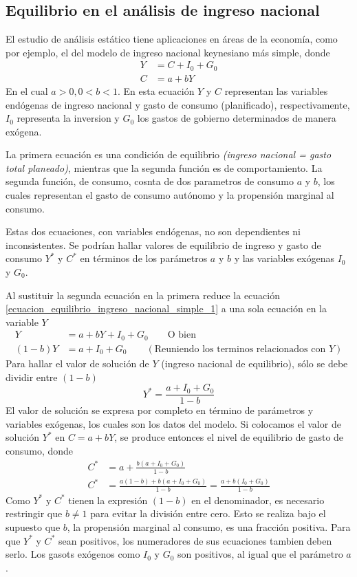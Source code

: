 \subsection{Equilibrio en el análisis de ingreso nacional}

El estudio de análisis estático tiene aplicaciones en áreas de la economía, como por ejemplo, el del modelo de ingreso nacional keynesiano más simple, donde
\begin{equation}
\label{ecuacion_equilibrio_ingreso_nacional_simple_1}
\begin{aligned}
Y &= C + I_0 + G_0 \\
C &= a + bY
\end{aligned}
\end{equation}
En el cual \(a > 0, 0<b<1\). En esta ecuación \(Y\) y \(C\) representan las variables endógenas de ingreso nacional y gasto de consumo (planificado), respectivamente, \(I_0\) representa la inversion y \(G_0\) los gastos de gobierno determinados de manera exógena. 

La primera ecuación es una condición de equilibrio \textit{(ingreso nacional = gasto total planeado)}, mientras que la segunda función es de comportamiento. La segunda función, de consumo, cosnta de dos parametros de consumo \(a\) y \(b\), los cuales representan el gasto de consumo autónomo y la propensión marginal al consumo.

Estas dos ecuaciones, con variables endógenas, no son dependientes ni inconsistentes. Se podrían hallar valores de equilibrio de ingreso y gasto de consumo \(Y^\ast\) y \(C^\ast\) en términos de los parámetros \(a\) y \(b\) y las variables exógenas \(I_0\) y \(G_0\).

Al sustituir la segunda ecuación en la primera reduce la ecuación \ref{ecuacion_equilibrio_ingreso_nacional_simple_1} a una sola ecuación en la variable \(Y\)
$$
\begin{aligned}
Y &= a + bY + I_0 + G_0  \qquad \text{O bien}\\
(1-b)Y &= a + I_0 + G_0 \qquad (\text{Reuniendo los terminos relacionados con } Y)
\end{aligned}
$$
Para hallar el valor de solución de \(Y\) (ingreso nacional de equilibrio), sólo se debe dividir entre \((1-b)\)
\[
Y^\ast=\frac{a + I_0 + G_0}{1-b}
\]
El valor de solución se expresa por completo en término de parámetros y variables exógenas, los cuales son los datos del modelo. Si colocamos el valor de solución \(Y^*\) en \(C = a + bY\), se produce entonces el nivel de equilibrio de gasto de consumo, donde 
$$
\begin{aligned}
C^\ast &= a + \frac{b(a + I_0 + G_0)}{1-b}\\
C^\ast &= \frac{a(1-b)+b(a+I_0+G_0)}{1-b}=\frac{a+b(I_0+G_0)}{1-b}
\end{aligned}
$$
Como \(Y^\ast\) y \(C^\ast\) tienen la expresión \((1-b)\) en el denominador, es necesario restringir que \(b \neq 1\) para evitar la división entre cero. Esto se realiza bajo el supuesto que \(b\), la propensión marginal al consumo, es una fracción positiva. Para que \(Y^\ast\) y \(C^\ast\) sean positivos, los numeradores de sus ecuaciones tambien deben serlo. Los gasots exógenos como \(I_0\) y \(G_0\) son positivos, al igual que el parámetro \(a\).

